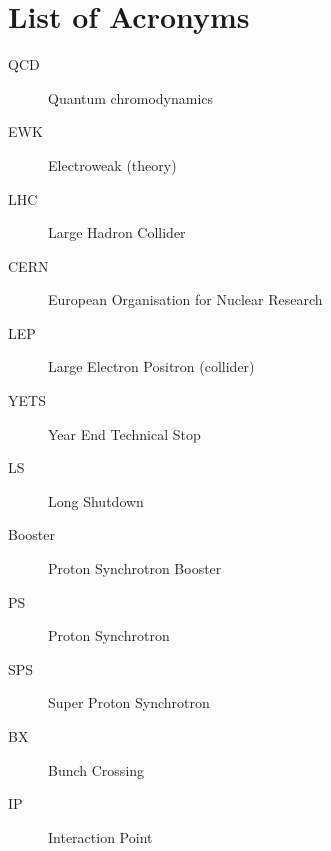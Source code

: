 \chapter{List of Acronyms}

  \begin{description}

    \item[QCD]		    \dotfill	Quantum chromodynamics
    \item[EWK]		    \dotfill	Electroweak (theory)

    \item[LHC]		    \dotfill	Large Hadron Collider
    \item[CERN]       \dotfill	European Organisation for Nuclear Research
    \item[LEP]        \dotfill  Large Electron Positron (collider)
    \item[YETS]       \dotfill  Year End Technical Stop
    \item[LS]         \dotfill  Long Shutdown
    \item[Booster]    \dotfill  Proton Synchrotron Booster
    \item[PS]         \dotfill  Proton Synchrotron
    \item[SPS]        \dotfill  Super Proton Synchrotron
    \item[BX]         \dotfill  Bunch Crossing
    \item[IP]         \dotfill  Interaction Point


  \end{description}
